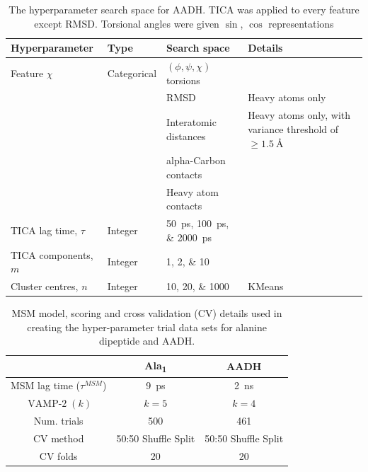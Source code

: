 \begin{table}
    \caption{The hyperparameter search space for AADH. TICA was applied to every feature except RMSD. Torsional angles were given $\sin$, $\cos$ representations}
    \centering
    \begin{tabularx}{0.9\textwidth}{ |>{\raggedright\arraybackslash}l|l|>{\raggedright\arraybackslash}X| >{\raggedright\arraybackslash}X | } 
    \hline
    \textbf{Hyperparameter} & \textbf{Type} & \textbf{Search space} & \textbf{Details} \\
     \hline\hline
    Feature $\chi$ & Categorical & $(\phi, \psi, \chi)$ torsions &  \\
    & & RMSD &  Heavy atoms only\\ 
    & & Interatomic distances & Heavy atoms only, with variance threshold of $\ge\SI{1.5}{\angstrom}$ \\
    & & alpha-Carbon contacts & \\ 
    & & Heavy atom contacts & \\ 

    \hline
    TICA lag time, $\tau$ & Integer &\SIlist[list-final-separator = { ... }]{50;100;2000}{ps} & \\
    \hline
    TICA components, $m$& Integer &\numlist[list-final-separator = { ... }]{1;2;10} & \\
    \hline
    Cluster centres, $n$ & Integer & \numlist[list-final-separator = { ... }]{10;20;1000} &  KMeans \\
    
     \hline
    \end{tabularx}
    \label{tab:aadh_searchspace}
\end{table}

\begin{table}
    \centering
    \caption{MSM model, scoring and cross validation (CV) details  used in creating the hyper-parameter trial data sets for alanine dipeptide and AADH.}
    \begin{tabular}{|c|c|c|}
    \hline
    & Ala\textsubscript{1} & AADH \\
    \hline\hline
    MSM lag time ($\tau^{MSM}$) & \SI{9}{\pico\second} & \SI{2}{\nano\second} \\         
    $\operatorname{VAMP-2}(k)$ & $k=5$ & $k=4$ \\
    Num. trials & 500 & 461 \\
    CV method & 50:50 Shuffle Split & 50:50 Shuffle Split \\
    CV folds & 20 & 20 \\
     \hline       
    \end{tabular}
    \label{tab:trial_specs}
\end{table}

